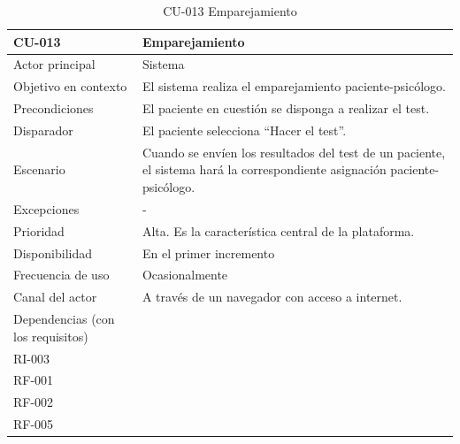 
\begin{table}[htbp]
\centering
\begin{tabularx}{\textwidth}{|X|X|}
\hline
CU-013                            & Emparejamiento                                                                                                             \\ \hline
Actor principal                   & Sistema                                                                                                                    \\ \hline
Objetivo en contexto              & El sistema realiza el emparejamiento paciente-psicólogo.                                                                   \\ \hline
Precondiciones                    & El paciente en cuestión se disponga a realizar el test.                                                                    \\ \hline
Disparador                        & El paciente selecciona “Hacer el test”.                                                                                    \\ \hline
Escenario                         & Cuando se envíen los resultados del test de un paciente, el sistema hará la correspondiente asignación paciente-psicólogo. \\ \hline
Excepciones                       & -                                                                                                                          \\ \hline
Prioridad                         & Alta. Es la característica central de la plataforma.                                                                       \\ \hline
Disponibilidad                    & En el primer incremento                                                                                                    \\ \hline
Frecuencia de uso                 & Ocasionalmente                                                                                                             \\ \hline
Canal del actor                   & A través de un navegador con acceso a internet.                                                                            \\ \hline
Dependencias (con los requisitos) & \begin{tabular}[c]{@{}l@{}}RI-001\\ RI-003\\ RF-001\\ RF-002\\  RF-005\end{tabular}                                                  \\ \hline
\end{tabularx}
\caption{CU-013 Emparejamiento}                        
\end{table}

